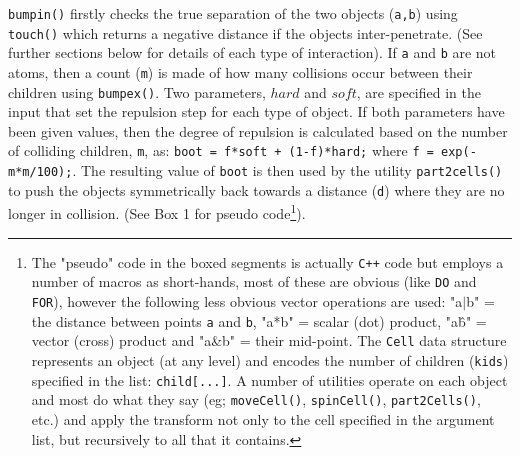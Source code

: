 \documentclass[review]{elsarticle}
\begin{document}
{\tt bumpin()} firstly checks the true separation of the two objects ({\tt a,b}) using {\tt touch()}
which returns a negative distance if the objects inter-penetrate. (See further sections
below for details of each type of interaction).   If {\tt a} and {\tt b} are not atoms, then
a count ({\tt m}) is made of how many collisions occur between their children using {\tt bumpex()}.
Two parameters,  $hard$ and $soft$, are specified in the input that set the repulsion step
for each type of object.  If both parameters have been given values,
then the degree of repulsion is calculated based on the number of colliding children, {\tt m},
as:  {\tt boot = f*soft + (1-f)*hard;} where {\tt f = exp(-m*m/100);}.     The resulting value
of {\tt boot} is then used by the utility {\tt part2cells()} to push the objects symmetrically
back towards a distance ({\tt d}) where they are no longer in collision. (See Box 1 for
pseudo code\footnote{
The "pseudo" code in the boxed segments is actually {\tt C++} code but employs a number of macros
as short-hands, most of these are obvious (like {\tt DO} and {\tt FOR}), however the following
less obvious vector operations are used:
"{a$|$b}" = the distance between points {\tt a} and {\tt b},
"{a*b}" = scalar (dot) product,
"{a\^b}" = vector (cross) product and
"{a\&b}" = their mid-point.
The {\tt Cell} data structure represents an object (at any level) and encodes the 
number of children ({\tt kids}) specified in the list: {\tt child[...]}.
A number of utilities operate on each object and most do what they say (eg;
{\tt moveCell()}, {\tt spinCell()}, {\tt part2Cells()}, etc.) and apply the transform
not only to the cell specified in the argument list, but recursively to all that it 
contains.}).
\end{document}
